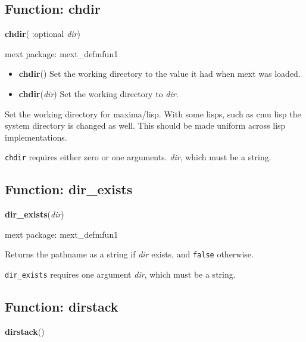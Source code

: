 \documentclass[]{article}
\begin{document}
\subsection{Function: chdir\label{sec:chdir}}
\hypertarget{chdir}{}
{\bf chdir}( :optional {\it dir})


\noindent mext package: mext\_defmfun1



\vspace{5 pt}
\begin{itemize}
\item[] {\bf chdir}()
  Set the working directory to the value it had when mext was loaded. 

\item[] {\bf chdir}({\it dir})
  Set the working directory to {\it dir}. 

\end{itemize}
Set the working directory for maxima/lisp. With some lisps, such as cmu lisp the system directory is changed as well. This should be made uniform across lisp implementations. 

\vspace{5 pt}

   {\tt chdir} requires either zero or one arguments.
 {\it dir}, which must be a string.


\vspace{5 pt}


\subsection{Function: dir\_exists\label{sec:dir_exists}}
\hypertarget{dir_exists}{}
{\bf dir\_exists}({\it dir})


\noindent mext package: mext\_defmfun1



\vspace{5 pt}
Returns the pathname as a string if {\it dir} exists, and \verb#false# otherwise. 

\vspace{5 pt}

   {\tt dir\_exists} requires one argument {\it dir}, which must be a string.


\vspace{5 pt}


\subsection{Function: dirstack\label{sec:dirstack}}
\hypertarget{dirstack}{}
{\bf dirstack}()
\end{document}
